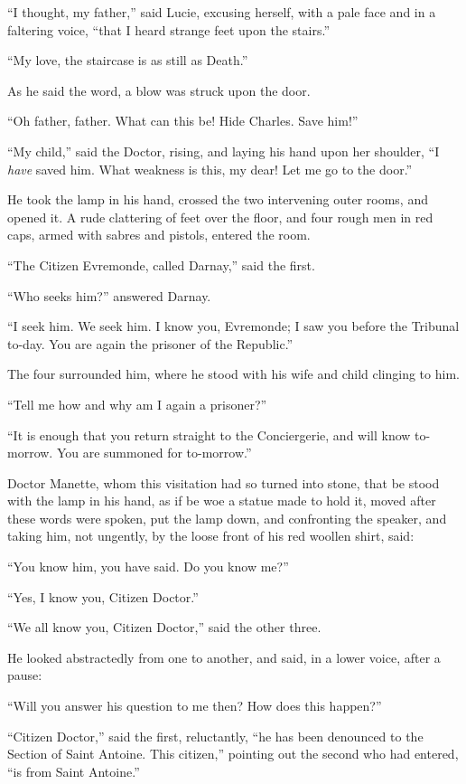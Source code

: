 ``I thought, my father,'' said Lucie, excusing herself, with a pale face
and in a faltering voice, ``that I heard strange feet upon the stairs.''

``My love, the staircase is as still as Death.''

As he said the word, a blow was struck upon the door.

``Oh father, father.  What can this be!  Hide Charles.  Save him!''

``My child,'' said the Doctor, rising, and laying his hand upon her
shoulder, ``I \emph{have} saved him.  What weakness is this, my dear!
Let me go to the door.''

He took the lamp in his hand, crossed the two intervening outer
rooms, and opened it.  A rude clattering of feet over the floor,
and four rough men in red caps, armed with sabres and pistols,
entered the room.

``The Citizen Evremonde, called Darnay,'' said the first.

``Who seeks him?'' answered Darnay.

``I seek him.  We seek him.  I know you, Evremonde; I saw you before
the Tribunal to-day.  You are again the prisoner of the Republic.''

The four surrounded him, where he stood with his wife and child
clinging to him.

``Tell me how and why am I again a prisoner?''

``It is enough that you return straight to the Conciergerie, and will
know to-morrow.  You are summoned for to-morrow.''

Doctor Manette, whom this visitation had so turned into stone, that
be stood with the lamp in his hand, as if be woe a statue made to
hold it, moved after these words were spoken, put the lamp down, and
confronting the speaker, and taking him, not ungently, by the loose
front of his red woollen shirt, said:

``You know him, you have said.  Do you know me?''

``Yes, I know you, Citizen Doctor.''

``We all know you, Citizen Doctor,'' said the other three.

He looked abstractedly from one to another, and said, in a lower
voice, after a pause:

``Will you answer his question to me then?  How does this happen?''

``Citizen Doctor,'' said the first, reluctantly, ``he has been denounced
to the Section of Saint Antoine.  This citizen,'' pointing out the
second who had entered, ``is from Saint Antoine.''

